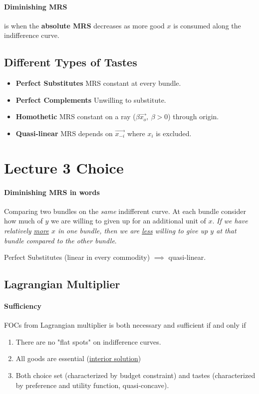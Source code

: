\documentclass[]{article}
\begin{document}
            \paragraph{Diminishing MRS} is when the \textbf{absolute MRS} decreases as more good $x$ is consumed along the indifference curve.
            
        \subsection{Different Types of Tastes}
            \begin{itemize}
                \item \textbf{Perfect Substitutes} MRS constant at every bundle.
                \item \textbf{Perfect Complements} Unwilling to substitute.
                \item \textbf{Homothetic} MRS constant on a ray ($\beta \vec{x_o},\ \beta > 0$) through origin.
                \item \textbf{Quasi-linear} MRS depends on $\vec{x_{-i}}$ where $x_i$ is excluded.
            \end{itemize}
            
    \section{Lecture 3 Choice}
        \paragraph{Diminishing MRS in words} Comparing two bundles on the \emph{same} indifferent curve. At each bundle consider how much of $y$ we are willing to given up for an additional unit of $x$. \emph{If we have relatively \ul{more} $x$ in one bundle, then we are \ul{less} willing to give up $y$ at that bundle compared to the other bundle}.
        
        \begin{remark}
            Perfect Substitutes (linear in every commodity) $\implies$ quasi-linear.
        \end{remark}
        
        \subsection{Lagrangian Multiplier}
            \paragraph{Sufficiency} FOCs from Lagrangian multiplier is both necessary and sufficient if and only if
                \begin{enumerate}
                    \item There are no "flat spots" on indifference curves.
                    \item All goods are essential (\ul{interior solution})
                    \item Both choice set (characterized by budget constraint) and tastes (characterized by preference and utility function, quasi-concave).
                \end{enumerate}
\end{document}
